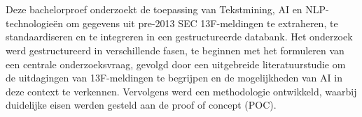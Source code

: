 
%
%
%
%
%

%



\chapter*{}


Deze bachelorproef onderzoekt de toepassing van Tekstmining, AI en NLP- technologieën om gegevens uit pre-2013 SEC 13F-meldingen te extraheren, te standaardiseren en te integreren in een gestructureerde databank. Het onderzoek werd gestructureerd in verschillende fasen, te beginnen met het formuleren van een centrale onderzoeksvraag, gevolgd door een uitgebreide literatuurstudie om de uitdagingen van 13F-meldingen te begrijpen en de mogelijkheden van AI in deze context te verkennen. Vervolgens werd een methodologie ontwikkeld, waarbij duidelijke eisen werden gesteld aan de proof of concept (POC).

